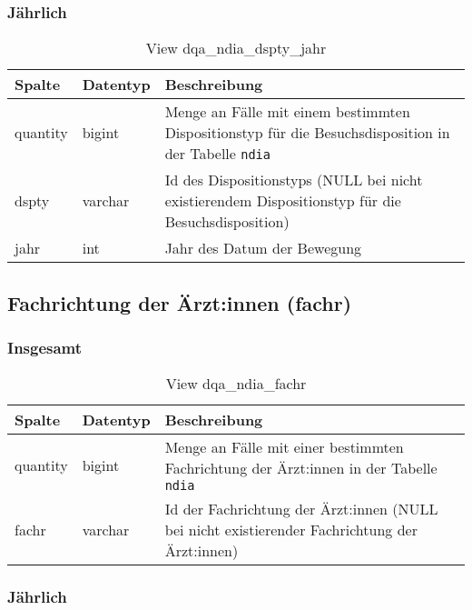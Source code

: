 \subsubsection{Jährlich} \label{subsubsec:bewDsptyJ}

\begin{table}[ht]
	\centering   
	\caption{View dqa\_ndia\_dspty\_jahr}
	\label{tab:bewDsptyJ}
	\begin{tabular}{||l|l|p{10cm}||}   		
		\hline
		Spalte & Datentyp & Beschreibung \\ [0.5ex]
		\hline\hline
		quantity & bigint & Menge an Fälle mit einem bestimmten Dispositionstyp für die Besuchsdisposition in der Tabelle \texttt{ndia}\\
		\hline
		dspty & varchar & Id des Dispositionstyps (NULL bei nicht existierendem Dispositionstyp für die Besuchsdisposition)\\
		\hline
		jahr & int &  Jahr des Datum der Bewegung \\
		\hline		
	\end{tabular}
\end{table}

\subsection{Fachrichtung der Ärzt:innen (fachr)} \label{subsec:bewFachr}

\subsubsection{Insgesamt} \label{subsubsec:bewFachrI}

\begin{table}[ht]
	\centering   
	\caption{View dqa\_ndia\_fachr}
	\label{tab:bewFachrI}
	\begin{tabular}{||l|l|p{10cm}||}   		
		\hline
		Spalte & Datentyp & Beschreibung \\ [0.5ex]
		\hline\hline
		quantity & bigint & Menge an Fälle mit einer bestimmten Fachrichtung der Ärzt:innen in der Tabelle \texttt{ndia} \\
		\hline
		fachr & varchar & Id der Fachrichtung der Ärzt:innen (NULL bei nicht existierender Fachrichtung der Ärzt:innen)\\
		\hline
		
	\end{tabular}
\end{table}

\subsubsection{Jährlich} \label{subsubsec:bewFachrJ}

